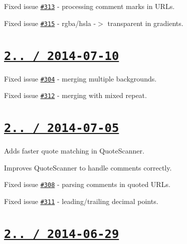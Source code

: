 \begin{DoxyItemize}
\item Fixed issue \href{https://github.com/jakubpawlowicz/clean-css/issues/313}{\tt \#313} -\/ processing comment marks in U\+R\+Ls.
\item Fixed issue \href{https://github.com/jakubpawlowicz/clean-css/issues/315}{\tt \#315} -\/ {\ttfamily rgba}/{\ttfamily hsla} -\/$>$ {\ttfamily transparent} in gradients.
\end{DoxyItemize}

\section*{\href{https://github.com/jakubpawlowicz/clean-css/compare/v2.2.6...v2.2.7}{\tt 2.. / 2014-\/07-\/10} }


\begin{DoxyItemize}
\item Fixed issue \href{https://github.com/jakubpawlowicz/clean-css/issues/304}{\tt \#304} -\/ merging multiple backgrounds.
\item Fixed issue \href{https://github.com/jakubpawlowicz/clean-css/issues/312}{\tt \#312} -\/ merging with mixed repeat.
\end{DoxyItemize}

\section*{\href{https://github.com/jakubpawlowicz/clean-css/compare/v2.2.5...v2.2.6}{\tt 2.. / 2014-\/07-\/05} }


\begin{DoxyItemize}
\item Adds faster quote matching in Quote\+Scanner.
\item Improves Quote\+Scanner to handle comments correctly.
\item Fixed issue \href{https://github.com/jakubpawlowicz/clean-css/issues/308}{\tt \#308} -\/ parsing comments in quoted U\+R\+Ls.
\item Fixed issue \href{https://github.com/jakubpawlowicz/clean-css/issues/311}{\tt \#311} -\/ leading/trailing decimal points.
\end{DoxyItemize}

\section*{\href{https://github.com/jakubpawlowicz/clean-css/compare/v2.2.4...v2.2.5}{\tt 2.. / 2014-\/06-\/29} }


